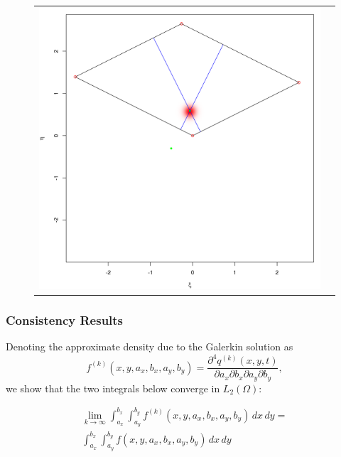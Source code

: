 \documentclass{beamer}
\begin{document}
\begin{frame}
\begin{itemize}
\begin{figure}
\begin{tabular}{cc}
\begin{minipage}{0.3\textwidth}
      \includegraphics[width=1\linewidth]{../small-time-solution.png}
    \end{minipage}
  \end{tabular}
\end{figure}
\end{itemize}
\end{frame}
\begin{frame}
  \frametitle{Consistency Results}
  Denoting the approximate density due to the Galerkin solution as
  \[
    f^{(k)}(x,y,a_x,b_x,a_y,b_y) = \frac{\partial^4
      q^{(k)}(x,y,t)}{\partial a_x \partial b_x \partial a_y \partial
      b_y},
  \]
  we show that the two integrals below converge in $L_2(\Omega)$:
  \begin{lemma}[1]\label{lem:1}
  \begin{multline*}
    \lim_{k\to \infty} \displaystyle \int_{a_x}^{b_x} \displaystyle
    \int_{a_y}^{b_y} f^{(k)}(x,y,a_x,b_x,a_y,b_y)\, dx\,dy = \\
    \displaystyle \int_{a_x}^{b_x} \displaystyle \int_{a_y}^{b_y}
    f(x,y,a_x,b_x,a_y,b_y)\, dx\,dy
  \end{multline*}
\end{lemma}
\end{frame}
\end{document}
